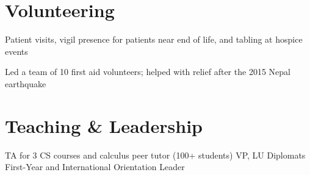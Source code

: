 \documentclass[]{deedy-resume-openfont}
\begin{document}
\begin{minipage}[t]{0.67\textwidth}
\section{Volunteering}
Patient visits, vigil presence for patients near end of life, and tabling at hospice events
\sectionsep

Led a team of 10 first aid volunteers; helped with relief after the 2015 Nepal earthquake
\sectionsep

\sectionsep

\section{Teaching \& Leadership}
TA for 3 CS courses and calculus peer tutor (100+ students) \textbullet{} VP, LU Diplomats \textbullet{} First-Year and International Orientation Leader

\end{minipage}
\end{document}
